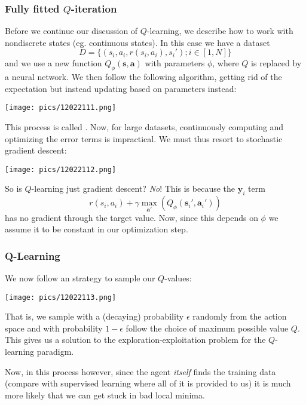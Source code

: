 \documentclass[11pt]{scrartcl}
\begin{document}
\subsubsection{Fully fitted $Q$-iteration}
Before we continue our discussion of $Q$-learning, we describe how to work with nondiscrete states (eg. continuous states). In this case we have a dataset
\begin{equation*}
    D = \{(s_i, a_i, r(s_i,a_i), s_i'); i \in [1,N]\}
\end{equation*}
and we use a new function $Q_{\phi}(\mathbf{s},\mathbf{a})$ with parameters $\phi$, where $Q$ is replaced by a neural network. We then follow the following algorithm, getting rid of the expectation but instead updating based on parameters instead:
\begin{center}
    \texttt{[image: pics/12022111.png]}
\end{center}
This process is called . Now, for large datasets, continuously computing and optimizing the error terms is impractical. We must thus resort to stochastic gradient descent:
\begin{center}
    \texttt{[image: pics/12022112.png]}
\end{center}

So is $Q$-learning just gradient descent? \textit{No}! This is because the $\textbf{y}_i$ term $$r(s_i,a_i)+\gamma\max_{\textbf{a}'}(Q_\phi(\textbf{s}_i',\textbf{a}_i'))$$
has no gradient through the target value. Now, since this depends on $\phi$ we assume it to be constant in our optimization step. 
\subsubsection{Q-Learning}
We now follow an  strategy to sample our $Q$-values: 
\begin{center}
    \texttt{[image: pics/12022113.png]}
\end{center}

That is, we sample with a (decaying) probability $\epsilon$ randomly from the action space and with probability $1-\epsilon$ follow the choice of maximum possible value $Q$. This gives us a solution to the exploration-exploitation problem for the $Q$-learning paradigm.

Now, in this process however, since the agent \textit{itself} finds the training data (compare with supervised learning where all of it is provided to us) it is much more likely that we can get stuck in bad local minima. 
\end{document}
